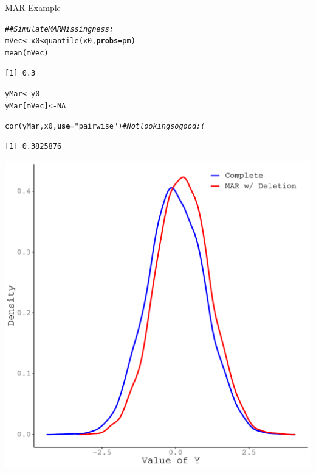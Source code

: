 \documentclass{beamer}\usepackage[]{graphicx}\usepackage[]{color}
\makeatletter
\newcommand{\hlnum}[1]{\textcolor[rgb]{0.69,0.494,0}{#1}}%
\newcommand{\hlstr}[1]{\textcolor[rgb]{0.749,0.012,0.012}{#1}}%
\newcommand{\hlcom}[1]{\textcolor[rgb]{0.514,0.506,0.514}{\textit{#1}}}%
\newcommand{\hlopt}[1]{\textcolor[rgb]{0,0,0}{#1}}%
\newcommand{\hlstd}[1]{\textcolor[rgb]{0,0,0}{#1}}%
\newcommand{\hlkwb}[1]{\textcolor[rgb]{0,0.341,0.682}{#1}}%
\newcommand{\hlkwc}[1]{\textcolor[rgb]{0,0,0}{\textbf{#1}}}%
\newcommand{\hlkwd}[1]{\textcolor[rgb]{0.004,0.004,0.506}{#1}}%
\newenvironment{kframe}{%
 \def\at@end@of@kframe{}%
 \ifinner\ifhmode%
  \def\at@end@of@kframe{\end{minipage}}%
  \begin{minipage}{\columnwidth}%
 \fi\fi%
 \def\FrameCommand##1{\hskip\@totalleftmargin \hskip-\fboxsep
 \colorbox{shadecolor}{##1}\hskip-\fboxsep
     \hskip-\linewidth \hskip-\@totalleftmargin \hskip\columnwidth}%
 \MakeFramed {\advance\hsize-\width
   \@totalleftmargin\z@ \linewidth\hsize
   \@setminipage}}%
 {\par\unskip\endMakeFramed%
 \at@end@of@kframe}
\newenvironment{knitrout}{}{} %
\makeatother
\begin{document}
\begin{frame}{MAR Example}

\begin{knitrout}\footnotesize
{}\color{fgcolor}\begin{kframe}
\begin{alltt}
\hlcom{## Simulate MAR Missingness:}
\hlstd{mVec} \hlkwb{<-} \hlstd{x0} \hlopt{<} \hlkwd{quantile}\hlstd{(x0,} \hlkwc{probs} \hlstd{= pm)}
\hlkwd{mean}\hlstd{(mVec)}
\end{alltt}
\begin{verbatim}
[1] 0.3
\end{verbatim}
\begin{alltt}
\hlstd{yMar}       \hlkwb{<-} \hlstd{y0}
\hlstd{yMar[mVec]} \hlkwb{<-} \hlnum{NA}

\hlkwd{cor}\hlstd{(yMar, x0,} \hlkwc{use} \hlstd{=} \hlstr{"pairwise"}\hlstd{)} \hlcom{# Not looking so good :(}
\end{alltt}
\begin{verbatim}
[1] 0.3825876
\end{verbatim}
\end{kframe}
\end{knitrout}

\pagebreak

\begin{knitrout}\footnotesize
{}\color{fgcolor}

{\centering \includegraphics[width=0.65\linewidth]{figure/intro-unnamed-chunk-14-1} 

}


\end{knitrout}

\end{frame}
\end{document}
